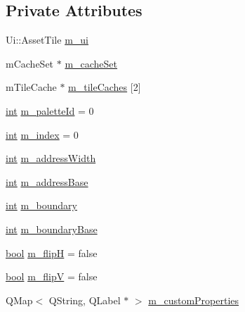 \subsection*{Private Attributes}
\begin{DoxyCompactItemize}
\item 
Ui\+::\+Asset\+Tile \mbox{\hyperlink{class_q_g_b_a_1_1_asset_tile_a8eb7313cfb111dcc43a72768642686cc}{m\+\_\+ui}}
\item 
m\+Cache\+Set $\ast$ \mbox{\hyperlink{class_q_g_b_a_1_1_asset_tile_ac163337a476d76022fbc6348f726bd96}{m\+\_\+cache\+Set}}
\item 
m\+Tile\+Cache $\ast$ \mbox{\hyperlink{class_q_g_b_a_1_1_asset_tile_a44e210e1e7ae8b4c1df7861c51334c59}{m\+\_\+tile\+Caches}} \mbox{[}2\mbox{]}
\item 
\mbox{\hyperlink{ioapi_8h_a787fa3cf048117ba7123753c1e74fcd6}{int}} \mbox{\hyperlink{class_q_g_b_a_1_1_asset_tile_a2102a9443fe2b56e6596987eb5e9a0e7}{m\+\_\+palette\+Id}} = 0
\item 
\mbox{\hyperlink{ioapi_8h_a787fa3cf048117ba7123753c1e74fcd6}{int}} \mbox{\hyperlink{class_q_g_b_a_1_1_asset_tile_a5fa13b29a3eceafeb63a1bfaebb714de}{m\+\_\+index}} = 0
\item 
\mbox{\hyperlink{ioapi_8h_a787fa3cf048117ba7123753c1e74fcd6}{int}} \mbox{\hyperlink{class_q_g_b_a_1_1_asset_tile_a6752f5e2109f413f2918e59511b3a053}{m\+\_\+address\+Width}}
\item 
\mbox{\hyperlink{ioapi_8h_a787fa3cf048117ba7123753c1e74fcd6}{int}} \mbox{\hyperlink{class_q_g_b_a_1_1_asset_tile_a51f3d80a13136b42e990e079e4990b3b}{m\+\_\+address\+Base}}
\item 
\mbox{\hyperlink{ioapi_8h_a787fa3cf048117ba7123753c1e74fcd6}{int}} \mbox{\hyperlink{class_q_g_b_a_1_1_asset_tile_a5dd36be9907f557fed65190adb73b612}{m\+\_\+boundary}}
\item 
\mbox{\hyperlink{ioapi_8h_a787fa3cf048117ba7123753c1e74fcd6}{int}} \mbox{\hyperlink{class_q_g_b_a_1_1_asset_tile_a26d2e218600602cf7d6c699b64e95259}{m\+\_\+boundary\+Base}}
\item 
\mbox{\hyperlink{libretro_8h_a4a26dcae73fb7e1528214a068aca317e}{bool}} \mbox{\hyperlink{class_q_g_b_a_1_1_asset_tile_a69cfaf34b922d214d9bc1666695565a1}{m\+\_\+flipH}} = false
\item 
\mbox{\hyperlink{libretro_8h_a4a26dcae73fb7e1528214a068aca317e}{bool}} \mbox{\hyperlink{class_q_g_b_a_1_1_asset_tile_a708b14479175191075c7a5401db2d28c}{m\+\_\+flipV}} = false
\item 
Q\+Map$<$ Q\+String, Q\+Label $\ast$ $>$ \mbox{\hyperlink{class_q_g_b_a_1_1_asset_tile_a52457779af4843f046fa31c1c71ea3b1}{m\+\_\+custom\+Properties}}
\end{DoxyCompactItemize}


